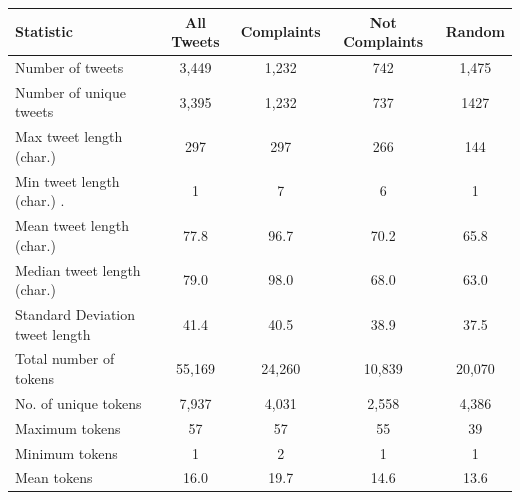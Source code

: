 \begin{table}[htbp]
    \captionsetup{font=small}
    \centering
    \begin{tabularx}{\textwidth}{|l|c|c|c|c|}
        \hline
        \rowcolor[gray]{0.7}
        \textbf{Statistic}              & \textbf{All Tweets} & \textbf{Complaints} & \textbf{Not Complaints} & \textbf{Random} \\
        \hline
        Number of tweets                & 3,449               & 1,232               & 742                     & 1,475           \\
        \hline
        Number of unique tweets         & 3,395               & 1,232               & 737                     & 1427            \\
        \hline
        \hline
        Max tweet length (char.)        & 297                 & 297                 & 266                     & 144             \\
        \hline
        Min tweet length (char.)   .    & 1                   & 7                   & 6                       & 1               \\
        \hline
        Mean tweet length (char.)       & 77.8                & 96.7                & 70.2                    & 65.8            \\
        \hline
        Median tweet length (char.)     & 79.0                & 98.0                & 68.0                    & 63.0            \\
        \hline
        Standard Deviation tweet length & 41.4                & 40.5                & 38.9                    & 37.5            \\
        \hline
        \hline
        Total number of tokens          & 55,169              & 24,260              & 10,839                  & 20,070          \\
        \hline
        No. of unique tokens            & 7,937               & 4,031               & 2,558                   & 4,386           \\
        \hline
        Maximum tokens                  & 57                  & 57                  & 55                      & 39              \\
        \hline
        Minimum tokens                  & 1                   & 2                   & 1                       & 1               \\
        \hline
        Mean tokens                     & 16.0                & 19.7                & 14.6                    & 13.6            \\

\end{tabularx}
\end{table}
